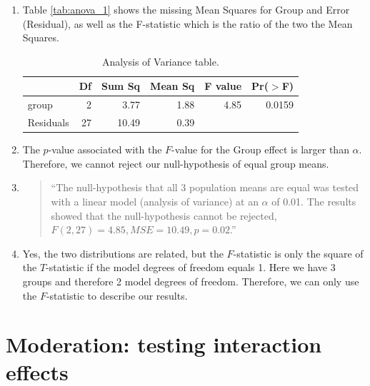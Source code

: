 \documentclass[]{book}\usepackage[]{graphicx}\usepackage[]{color}
\begin{document}
\begin{enumerate}

\item 

Table \ref{tab:anova_1} shows the missing Mean Squares for Group and Error (Residual), as well as the F-statistic which is the ratio of the two the Mean Squares. 

\begin{table}[ht]
\centering
\caption{Analysis of Variance table.} 
\label{tab:anova_2}
\begin{tabular}{lrrrrr}
  \hline
 & Df & Sum Sq & Mean Sq & F value & Pr($>$F) \\ 
  \hline
group & 2 & 3.77 & 1.88 & 4.85 & 0.0159 \\ 
  Residuals & 27 & 10.49 & 0.39 &  &  \\ 
   \hline
\end{tabular}
\end{table}


\item The $p$-value associated with the $F$-value for the Group effect is larger than $\alpha$. Therefore, we cannot reject our null-hypothesis of equal group means. 


\item 

\begin{quote}
``The null-hypothesis that all 3 population means are equal was tested with a linear model (analysis of variance) at an $\alpha$ of 0.01. The results showed that the null-hypothesis cannot be rejected, $F(2, 27) = 4.85, MSE = 10.49 , p = 0.02$.''
\end{quote}


\item Yes, the two distributions are related, but the $F$-statistic is only the square of the $T$-statistic if the model degrees of freedom equals 1. Here we have 3 groups and therefore 2 model degrees of freedom. Therefore, we can only use the $F$-statistic to describe our results.



\end{enumerate}






\chapter{Moderation: testing interaction effects}\label{chap:moderation}
\end{document}
